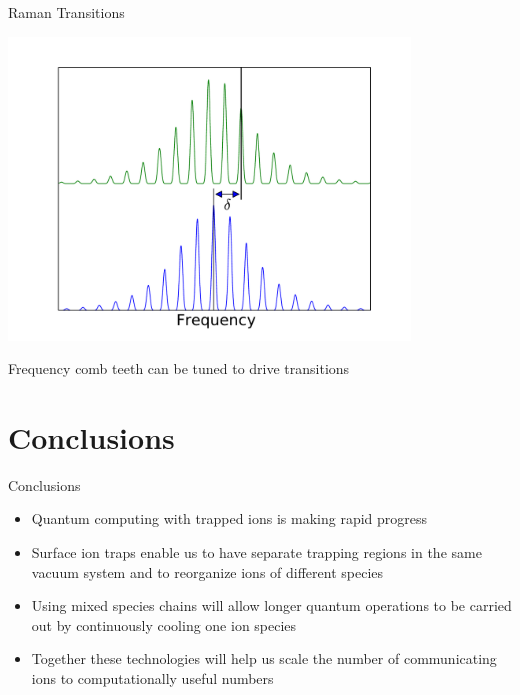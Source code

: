 \documentclass{beamer}
\begin{document}
\begin{frame}{Raman Transitions}
	\centerline{\includegraphics[width=0.8\textwidth]{Raman}}
	\centerline{Frequency comb teeth can be tuned to drive transitions}
\end{frame}

\section[]{Conclusions}
\begin{frame}{Conclusions}
\begin{itemize}
	\item Quantum computing with trapped ions is making rapid progress
	\item Surface ion traps enable us to have separate trapping regions in the same vacuum system and to reorganize ions of different species
	\item Using mixed species chains will allow longer quantum operations to be carried out by continuously cooling one ion species
	\item Together these technologies will help us scale the number of communicating ions to computationally useful numbers
\end{itemize}
\end{frame}
\end{document}
